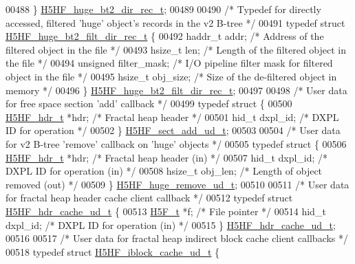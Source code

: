 \begin{DoxyCode}
00488 \} \hyperlink{struct_h5_h_f__huge__bt2__dir__rec__t}{H5HF\_huge\_bt2\_dir\_rec\_t};
00489 
00490 \textcolor{comment}{/* Typedef for directly accessed, filtered 'huge' object's records in the v2 B-tree */}
00491 \textcolor{keyword}{typedef} \textcolor{keyword}{struct }\hyperlink{struct_h5_h_f__huge__bt2__filt__dir__rec__t}{H5HF\_huge\_bt2\_filt\_dir\_rec\_t} \{
00492     haddr\_t addr;       \textcolor{comment}{/* Address of the filtered object in the file */}
00493     hsize\_t len;        \textcolor{comment}{/* Length of the filtered object in the file */}
00494     \textcolor{keywordtype}{unsigned} filter\_mask;   \textcolor{comment}{/* I/O pipeline filter mask for filtered object in the file */}
00495     hsize\_t obj\_size;   \textcolor{comment}{/* Size of the de-filtered object in memory */}
00496 \} \hyperlink{struct_h5_h_f__huge__bt2__filt__dir__rec__t}{H5HF\_huge\_bt2\_filt\_dir\_rec\_t};
00497 
00498 \textcolor{comment}{/* User data for free space section 'add' callback */}
00499 \textcolor{keyword}{typedef} \textcolor{keyword}{struct }\{
00500     \hyperlink{struct_h5_h_f__hdr__t}{H5HF\_hdr\_t} *hdr;            \textcolor{comment}{/* Fractal heap header */}
00501     hid\_t dxpl\_id;              \textcolor{comment}{/* DXPL ID for operation */}
00502 \} \hyperlink{struct_h5_h_f__sect__add__ud__t}{H5HF\_sect\_add\_ud\_t};
00503 
00504 \textcolor{comment}{/* User data for v2 B-tree 'remove' callback on 'huge' objects */}
00505 \textcolor{keyword}{typedef} \textcolor{keyword}{struct }\{
00506     \hyperlink{struct_h5_h_f__hdr__t}{H5HF\_hdr\_t} *hdr;            \textcolor{comment}{/* Fractal heap header (in) */}
00507     hid\_t dxpl\_id;              \textcolor{comment}{/* DXPL ID for operation (in) */}
00508     hsize\_t obj\_len;            \textcolor{comment}{/* Length of object removed (out) */}
00509 \} \hyperlink{struct_h5_h_f__huge__remove__ud__t}{H5HF\_huge\_remove\_ud\_t};
00510 
00511 \textcolor{comment}{/* User data for fractal heap header cache client callback */}
00512 \textcolor{keyword}{typedef} \textcolor{keyword}{struct }\hyperlink{struct_h5_h_f__hdr__cache__ud__t}{H5HF\_hdr\_cache\_ud\_t} \{
00513     \hyperlink{struct_h5_f__t}{H5F\_t} *f;                   \textcolor{comment}{/* File pointer */}
00514     hid\_t dxpl\_id;              \textcolor{comment}{/* DXPL ID for operation (in) */}
00515 \} \hyperlink{struct_h5_h_f__hdr__cache__ud__t}{H5HF\_hdr\_cache\_ud\_t};
00516 
00517 \textcolor{comment}{/* User data for fractal heap indirect block cache client callbacks */}
00518 \textcolor{keyword}{typedef} \textcolor{keyword}{struct }\hyperlink{struct_h5_h_f__iblock__cache__ud__t}{H5HF\_iblock\_cache\_ud\_t} \{

\end{DoxyCode}
